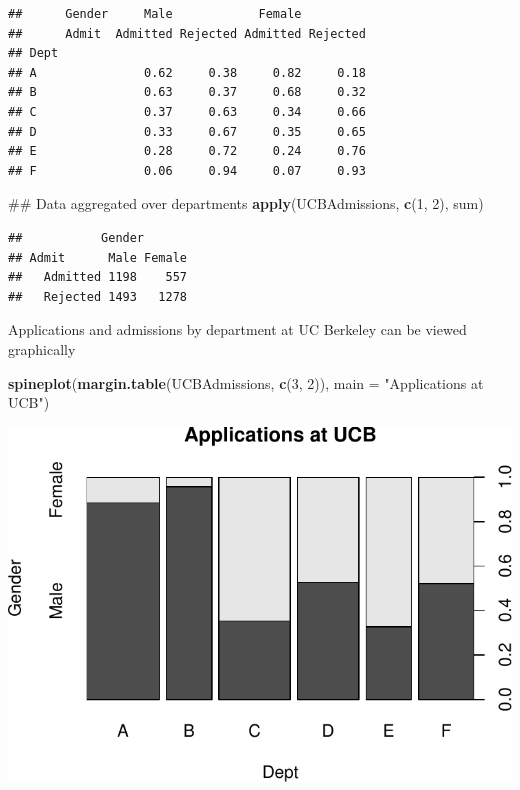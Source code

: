 \documentclass[]{article}
\newenvironment{Shaded}{\begin{snugshade}}{\end{snugshade}}
\newcommand{\KeywordTok}[1]{\textcolor[rgb]{0.13,0.29,0.53}{\textbf{{#1}}}}
\newcommand{\DataTypeTok}[1]{\textcolor[rgb]{0.13,0.29,0.53}{{#1}}}
\newcommand{\DecValTok}[1]{\textcolor[rgb]{0.00,0.00,0.81}{{#1}}}
\newcommand{\StringTok}[1]{\textcolor[rgb]{0.31,0.60,0.02}{{#1}}}
\newcommand{\NormalTok}[1]{{#1}}
\numberwithin{equation}{section}
\begin{document}
\begin{verbatim}
##      Gender     Male            Female         
##      Admit  Admitted Rejected Admitted Rejected
## Dept                                           
## A               0.62     0.38     0.82     0.18
## B               0.63     0.37     0.68     0.32
## C               0.37     0.63     0.34     0.66
## D               0.33     0.67     0.35     0.65
## E               0.28     0.72     0.24     0.76
## F               0.06     0.94     0.07     0.93
\end{verbatim}

\begin{Shaded}
\begin{Highlighting}[]
\NormalTok{## Data aggregated over departments}
\KeywordTok{apply}\NormalTok{(UCBAdmissions, }\KeywordTok{c}\NormalTok{(}\DecValTok{1}\NormalTok{, }\DecValTok{2}\NormalTok{), sum)}
\end{Highlighting}
\end{Shaded}

\begin{verbatim}
##           Gender
## Admit      Male Female
##   Admitted 1198    557
##   Rejected 1493   1278
\end{verbatim}

Applications and admissions by department at UC Berkeley can be viewed
graphically

\begin{Shaded}
\begin{Highlighting}[]
\KeywordTok{spineplot}\NormalTok{(}\KeywordTok{margin.table}\NormalTok{(UCBAdmissions, }\KeywordTok{c}\NormalTok{(}\DecValTok{3}\NormalTok{, }\DecValTok{2}\NormalTok{)),}
           \DataTypeTok{main =} \StringTok{"Applications at UCB"}\NormalTok{)}
\end{Highlighting}
\end{Shaded}

\includegraphics{index_files/figure-latex/unnamed-chunk-100-1.pdf}
\end{document}
